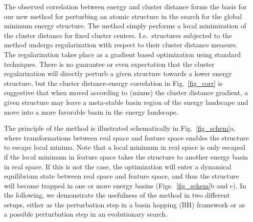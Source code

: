 \documentclass[aip,amsmath,amssymb,reprint]{revtex4-1}
\begin{document}
The observed correlation between energy and cluster distance forms the
basis for our new method for perturbing an atomic structure in the
search for the global minimum energy structure. The method simply
performs a local minimization of the cluster distance for fixed
cluster centers. I.e.\ structures subjected to the method undergo
regularization with respect to their cluster distance measure. The
regularization takes place as a gradient based optimization using
standard techniques. There is no guarantee or even expectation that the
cluster regularization will directly perturb a given structure towards
a lower energy structure, but the cluster distance-energy correlation
in Fig.\ \ref{fig_corr} is suggestive that when moved according to (minus) the cluster distance gradient, a given structure may leave a meta-stable basin
region of the energy landscape and move into a more favorable
basin in the energy landscape.

The principle of the method is illustrated schematically in
Fig.\ \ref{fig_schem}a, where transformations between real space and
feature space enables the structure to escape local minima. Note that
a local minimum in real space is only escaped if the local minimum in
feature space takes the structure to another energy basin in real
space. If this is not the case, the optimization will enter a
dynamical equilibrium state between real space and feature space, and
thus the structure will become trapped in one or more energy basins
(Figs.\ \ref{fig_schem}b and c). In the following, we demonstrate the
usefulness of the method in two different setups, either as the
perturbation step in a basin hopping (BH) framework or as a possible
perturbation step in an evolutionary search.
\end{document}

